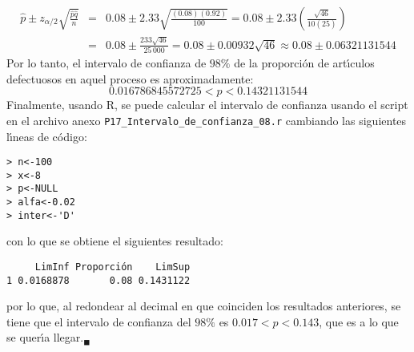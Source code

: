 \begin{solucion}
\begin{eqnarray*}
  \hat{p} \pm z_{\alpha/2}\sqrt{\frac{\hat{p}\hat{q}}{n}} & = & 0.08 \pm 2.33\sqrt{\frac{(0.08)(0.92)}{100}} = 0.08 \pm 2.33 \left( \frac{\sqrt{46}}{10(25)}\right) \\
  & = & 0.08 \pm \frac{233\sqrt{46}}{25\,000} = 0.08 \pm 0.00932\sqrt{46} \approx 0.08 \pm 0.06321131544
 \end{eqnarray*}
 Por lo tanto, el intervalo de confianza de $98\%$ de la proporci\'on de art\'{\i}culos defectuosos en aquel proceso es aproximadamente:
 \begin{equation*}
  0.016786845572725 < p < 
  0.14321131544
 \end{equation*}
 Finalmente, usando R, se puede calcular el intervalo de confianza usando el script en el archivo anexo \texttt{P17\_Intervalo\_de\_confianza\_08.r} cambiando las siguientes l\'{\i}neas de c\'odigo:
 \begin{verbatim}
> n<-100
> x<-8
> p<-NULL
> alfa<-0.02
> inter<-'D'
 \end{verbatim}
 \vspace{-0.5cm}
 con lo que se obtiene el siguientes resultado:
 \begin{verbatim}
     LimInf Proporción    LimSup
1 0.0168878       0.08 0.1431122
 \end{verbatim}
 \vspace{-0.5cm}
 por lo que, al redondear al decimal en que coinciden los resultados anteriores, se tiene que el intervalo de confianza del $98\%$ es $0.017 < p < 0.143$, que es a lo que se quer\'{\i}a llegar.${}_{\blacksquare}$
\end{solucion}
